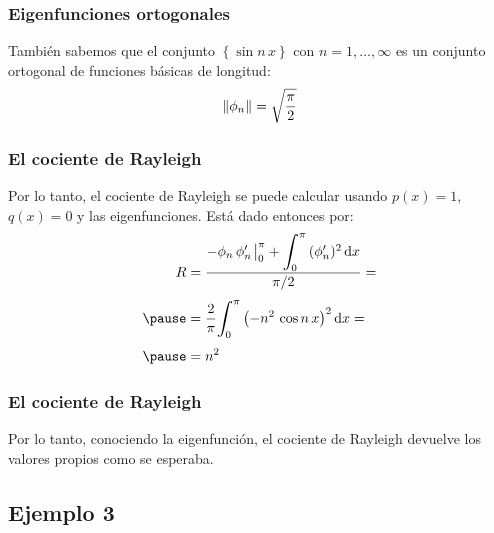 \documentclass[12pt]{beamer}
\begin{document}
\begin{frame}
\frametitle{Eigenfunciones ortogonales}
También sabemos que el conjunto $\left\{ \sin n \, x \right\}$ con $n = 1, \ldots, \infty$ es un conjunto ortogonal de funciones básicas de longitud:
\pause
\begin{align*}
\norm{\phi_{n}} = \sqrt{\dfrac{\pi}{2}}
\end{align*}
\end{frame}
\begin{frame}
\frametitle{El cociente de Rayleigh}
Por lo tanto, el cociente de Rayleigh se puede calcular usando $p(x) = 1$, $q (x) = 0$ y las eigenfunciones. \pause Está dado entonces por:
\pause
\begin{eqnarray}
\begin{aligned}[b]
R &= \dfrac{- \phi_{n} \, \pderivada{\phi}_{n} \eval_{0}^{\pi} + \scaleint{6ex}_{\bs 0}^{\pi} \, (\pderivada{\phi}_{n})^{2} \dd{x}}{\pi/2} = \\[0.35em] \pause
&= \dfrac{2}{\pi} \scaleint{6ex}_{\bs 0}^{\pi} \left( - n^{2} \, \cos n \, x \right)^{2} \dd{x} = \\[0.35em] \pause
&= n^{2}
\end{aligned}
\label{eq:ecuacion_04_13}
\end{eqnarray}
\end{frame}
\begin{frame}
\frametitle{El cociente de Rayleigh}
Por lo tanto, conociendo la eigenfunción, el cociente de Rayleigh devuelve los valores propios como se esperaba.
\end{frame}

\subsection*{Ejemplo 3}
\end{document}
